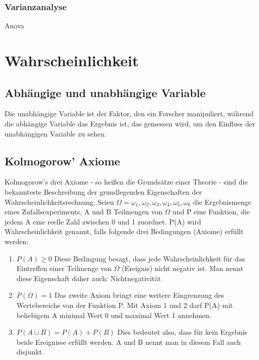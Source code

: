 \documentclass[letterpaper, titlepage]{article}
\begin{document}
\subsubsection{Varianzanalyse}\label{Varianzanalyse}
Anova

\vspace{0.35cm}

\section{Wahrscheinlichkeit}\label{Wahrscheinlichkeit}

\vspace{0.35cm}

\subsection{Abhängige und unabhängige Variable}\label{Abhängige und unabhängige Variable}
Die unabhängige Variable ist der Faktor, den ein Forscher manipuliert, während die abhängige Variable das Ergebnis ist, das gemessen wird, um den Einfluss der unabhängigen Variable zu sehen.

\vspace{0.35cm}

\subsection{Kolmogorow' Axiome}\label{Kolmogorow's Axiome}
Kolmogorow's drei Axiome - so heißen die Grundsätze einer Theorie - sind die bekannteste Beschreibung der grundlegenden Eigenschaften der Wahrscheinlichkeitsrechnung. Seien $\Omega={\omega_1, \omega_2, \omega_3, \omega_4, \omega_5, \omega_6}$ die Ergebnismenge eines Zufallsexperiments, A und B Teilmengen von $\Omega$ und P eine Funktion, die jedem A eine reelle Zahl zwischen 0 und 1 zuordnet. P(A) wird Wahrscheinlichkeit genannt, falls folgende drei Bedingungen (Axiome) erfüllt werden:
\begin{enumerate}
    \item $P(A)\geq0$ Diese Bedingung besagt, dass jede Wahrscheinlichkeit für das Eintreffen einer Teilmenge von $\Omega$ (Ereignis) nicht negativ ist. Man nennt diese Eigenschaft daher auch: Nichtnegativität
    \item $P(\Omega)=1$ Das zweite Axiom bringt eine weitere Eingrenzung des Wertebereichs von der Funktion P. Mit Axiom 1 und 2 darf P(A) mit beliebigem A minimal Wert 0 und maximal Wert 1 annehmen.
    \item $P(A \cup B)=P(A)+P(B)$ Dies bedeutet also, dass für kein Ergebnis beide Ereignisse erfüllt werden. A und B nennt man in diesem Fall auch disjunkt.
\end{enumerate}
\end{document}
